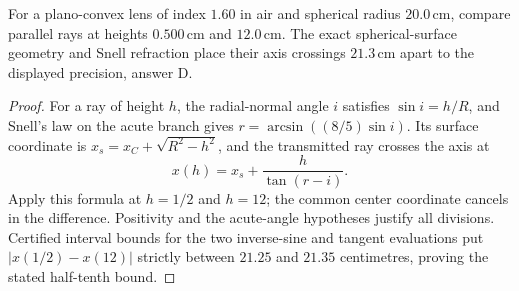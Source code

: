 \begin{theorem}
\label{thm:physics:phyx_mini_0028:target}
For a plano-convex lens of index \(1.60\) in air and spherical radius
\(20.0\,\mathrm{cm}\), compare parallel rays at heights \(0.500\,\mathrm{cm}\)
and \(12.0\,\mathrm{cm}\).  The exact spherical-surface geometry and Snell
refraction place their axis crossings \(21.3\,\mathrm{cm}\) apart to the
displayed precision, answer D.
\end{theorem}
\begin{proof}
For a ray of height \(h\), the radial-normal angle \(i\) satisfies
\(\sin i=h/R\), and Snell's law on the acute branch gives
\(r=\arcsin((8/5)\sin i)\).  Its surface coordinate is
\(x_s=x_C+\sqrt{R^2-h^2}\), and the transmitted ray crosses the axis at
\[
 x(h)=x_s+\frac{h}{\tan(r-i)}.
\]
Apply this formula at \(h=1/2\) and \(h=12\); the common center coordinate
cancels in the difference.  Positivity and the acute-angle hypotheses justify
all divisions.  Certified interval bounds for the two inverse-sine and
tangent evaluations put \(|x(1/2)-x(12)|\) strictly between
\(21.25\) and \(21.35\) centimetres, proving the stated half-tenth bound.
\end{proof}

